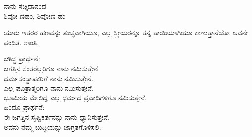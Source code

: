 \begin{myquote}
ನಾನು ಸಚ್ಚಿದಾನಂದ\\ಶಿವೋ ಣಿಹಂ, ಶಿವೋಣಿ ಹಂ
\end{myquote}

ಯಾರು ಇತರರ ಹಣವನ್ನು ತುಚ್ಛವಾಗಿಯೂ, ಎಲ್ಲ ಸ್ತ್ರೀಯರನ್ನೂ ತನ್ನ ತಾಯಿಯಾಗಿಯೂ ಕಾಣುತ್ತಾನೆಯೋ ಅವನೇ ಪಂಡಿತ. ಶಾಂತಿ.

\begin{myquote}
ಬೌದ್ಧ ಪ್ರಾರ್ಥನೆ:\\ಜಗತ್ತಿನ ಸಂತರೆಲ್ಲರಿಗೂ ನಾನು ನಮಿಸುತ್ತೇನೆ\\ಧರ್ಮಸಂಸ್ಥಾಪಕರಿಗೆ ನಾನು ನಮಿಸುತ್ತೇನೆ.\\ಎಲ್ಲ ಪವಿತ್ರಾತ್ಮರಿಗೂ ನಾನು ನಮಿಸುತ್ತೇನೆ.\\ಭೂಮಿಯ ಮೇಲಿದ್ದ ಎಲ್ಲ ಧರ್ಮದ ಪ್ರವಾದಿಗಳಿಗೂ ನಮಿಸುತ್ತೇನೆ.\\ಹಿಂದೂ ಪ್ರಾರ್ಥನೆ:\\ಈ ಜಗತ್ತಿನ ಸೃಷ್ಟಿಕರ್ತನನ್ನು ನಾನು ಧ್ಯಾನಿಸುತ್ತೇನೆ,\\ಅವನು ನಮ್ಮ ಬುದ್ಧಿಯನ್ನು ಜಾಗ್ರತಗೊಳಿಸಲಿ.
\end{myquote}

